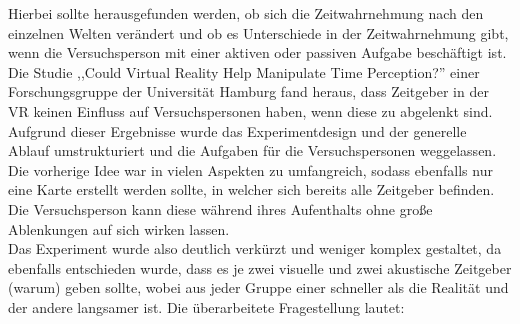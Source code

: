 \documentclass{Bericht}
\begin{document}
	 Hierbei sollte herausgefunden werden, ob sich die Zeitwahrnehmung nach den einzelnen Welten verändert und ob es Unterschiede in der Zeitwahrnehmung gibt, wenn die Versuchsperson mit einer aktiven oder passiven Aufgabe beschäftigt ist.\\
	 Die Studie ,,Could Virtual Reality Help Manipulate Time Perception?'' einer Forschungsgruppe der Universität Hamburg fand heraus, dass Zeitgeber in der VR keinen Einfluss auf Versuchspersonen haben, wenn diese zu abgelenkt sind. Aufgrund dieser Ergebnisse wurde das Experimentdesign und der generelle Ablauf umstrukturiert und die Aufgaben für die Versuchspersonen weggelassen.\\
Die vorherige Idee war in vielen Aspekten zu umfangreich, sodass ebenfalls nur eine Karte erstellt werden sollte, in welcher sich bereits alle Zeitgeber befinden. Die Versuchsperson kann diese während ihres Aufenthalts ohne große Ablenkungen auf sich wirken lassen.\\
Das Experiment wurde also deutlich verkürzt und weniger komplex gestaltet, da ebenfalls entschieden wurde, dass es je zwei visuelle und zwei akustische Zeitgeber (warum) geben sollte, wobei aus jeder Gruppe einer schneller als die Realität und der andere langsamer ist. Die überarbeitete Fragestellung lautet: 
 
	 




	
\end{document}
